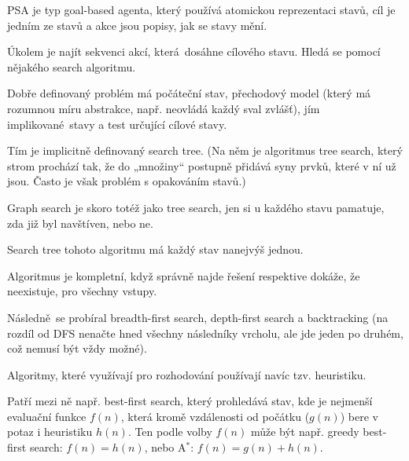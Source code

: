 \documentclass[12pt]{article}					%
\begin{document}
\begin{definice}
	PSA je typ goal-based agenta, který používá atomickou reprezentaci stavů, cíl je jedním ze stavů a akce jsou popisy, jak se stavy mění.

	Úkolem je najít sekvenci akcí, která dosáhne cílového stavu. Hledá se pomocí nějakého search algoritmu.
\end{definice}

\begin{definice}
	Dobře definovaný problém má počáteční stav, přechodový model (který má rozumnou míru abstrakce, např. neovládá každý sval zvlášť), jím implikované stavy a test určující cílové stavy.

	Tím je implicitně definovaný search tree. (Na něm je algoritmus tree search, který strom prochází tak, že do „množiny“ postupně přidává syny prvků, které v ní už jsou. Často je však problém s opakováním stavů.)
\end{definice}

\begin{definice}
	Graph search je skoro totéž jako tree search, jen si u každého stavu pamatuje, zda již byl navštíven, nebo ne.

	Search tree tohoto algoritmu má každý stav nanejvýš jednou.
\end{definice}

\begin{definice}
	Algoritmus je kompletní, když správně najde řešení respektive dokáže, že neexistuje, pro všechny vstupy.
\end{definice}

\begin{poznamka}
	Následně se probíral breadth-first search, depth-first search a backtracking (na rozdíl od DFS nenačte hned všechny následníky vrcholu, ale jde jeden po druhém, což nemusí být vždy možné).
\end{poznamka}

\begin{definice}
	Algoritmy, které využívají pro rozhodování používají navíc tzv. heuristiku.

	Patří mezi ně např. best-first search, který prohledává stav, kde je nejmenší evaluační funkce $f(n)$, která kromě vzdálenosti od počátku ($g(n)$) bere v potaz i heuristiku $h(n)$. Ten podle volby $f(n)$ může být např. greedy best-first search: $f(n) = h(n)$, nebo A$^*$: $f(n) = g(n) + h(n)$.
\end{definice}
\end{document}
